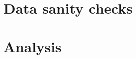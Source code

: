 \documentclass{article}
\begin{document}
\section{Data sanity checks}\label{sec:methods}


% 


\section{Analysis}

\end{document}
